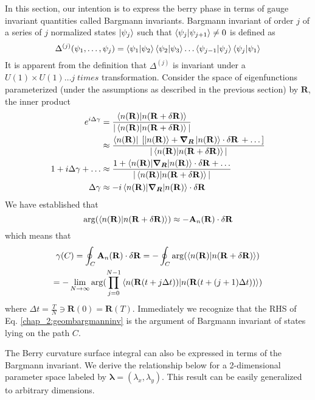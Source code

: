 In this section, our intention is to express the berry phase in terms of gauge invariant quantities called Bargmann invariants. 
Bargmann invariant of order $j$ of a series of $j$ normalized states $\ket{\psi_j}$ such that $\braket{\psi_j|\psi_{j+1}} \neq 0$ is defined as 
\begin{equation}
 \Delta^{(j)}(\psi_1, \dots, \psi_j) = \braket{\psi_1 | \psi_2}\braket{\psi_2|\psi_3}\dots\braket{\psi_{j-1}|\psi_j}\braket{\psi_j|\psi_1}
\end{equation} It is apparent from the definition that $\Delta^{(j)}$ is invariant under a $U(1) \times U(1) \dots j\;times$ transformation.
Consider the space of eigenfunctions parameterized (under the assumptions as 
described in the previous section) by $\mathbf{R}$, the inner product 
\begin{align}
e^{i\Delta\gamma} &= \frac{\braket{n(\mathbf{R})|n(\mathbf{R} +\delta\mathbf{R})}}{|\braket{n(\mathbf{R})|n(\mathbf{R} +\delta\mathbf{R})}|} \\
 		  &\approx \frac{\bra{n(\mathbf{R})}\;\lbrack \ket{n(\mathbf{R})} + \bm{\nabla_R}\ket{n(\mathbf{R})}\cdot \delta\mathbf{R}\, + \dots \rbrack}{|\braket{n(\mathbf{R})|n(\mathbf{R} +\delta\mathbf{R})}|} \nonumber \\
1 + i\Delta\gamma + \dots &\approx \frac{1 + \braket{n(\mathbf{R})|\bm{\nabla_R}|n(\mathbf{R})}\cdot \delta\mathbf{R} + \dots}{|\braket{n(\mathbf{R})|n(\mathbf{R} +\delta\mathbf{R})}|} \nonumber \\
\Delta\gamma	   &\approx  -i\braket{n(\mathbf{R})|\bm{\nabla_R}|n(\mathbf{R})}\cdot \delta\mathbf{R}
\end{align}
We have established that 
\begin{equation*}
 \arg(\braket{n(\mathbf{R})|n(\mathbf{R} +\delta\mathbf{R})}) \approx -\mathbf{A}_{n}(\mathbf{R}) \cdot \delta\mathbf{R}
\end{equation*} which means that
\begin{multline}
 \label{chap_2:geombargmanninv}\gamma(C) = \oint_{C}{\mathbf{A}_{n}(\mathbf{R}) \cdot \delta\mathbf{R}}  = -\oint_{C}{\arg(\braket{n(\mathbf{R})|n(\mathbf{R} +\delta\mathbf{R})})} \\ = -\lim_{N\rightarrow\infty} \arg(\prod_{j=0}^{N-1}{\braket{n(\mathbf{R}(t + j\Delta t))|n(\mathbf{R}(t + (j+1)\Delta t))}})
\end{multline} where $\Delta t = \frac{T}{N} \ni \mathbf{R}(0)=\mathbf{R}(T)$.
Immediately we recognize that the RHS of Eq. \eqref{chap_2:geombargmanninv} is the argument of Bargmann invariant of states lying on the path $C$.

The Berry curvature surface integral can also be expressed in terms of the Bargmann invariant. We derive the relationship below for a 2-dimensional parameter space
labeled by $\bm{\lambda} = (\lambda_x, \lambda_y)$. This result can be easily generalized to arbitrary dimensions.

